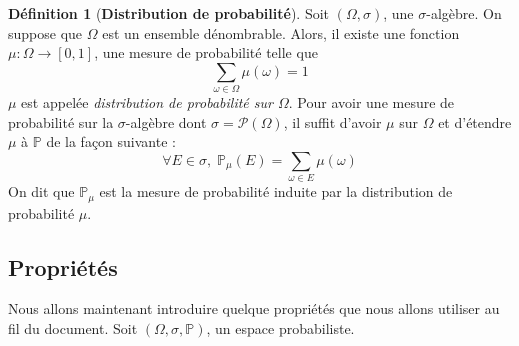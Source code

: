 \documentclass[12pt,a4paper]{report}
\theoremstyle{definition}%
\newtheorem{definition}{Définition}[chapter]
\theoremstyle{remark}
\newcommand{\pr}{\mathbb{P}}
\begin{document}
\begin{definition}[\textbf{Distribution de probabilité}] \label{distriprobadef}
	Soit $(\Omega, \sigma)$, une $\sigma$-algèbre.
	On suppose que $\Omega$ est un ensemble dénombrable. Alors, il existe une fonction $\mu: \Omega \rightarrow [0,1]$, une mesure de probabilité telle que
	\[\sum_{\omega \in \Omega} \mu(\omega) =1 \]
	$\mu$ est appelée \textit{distribution de probabilité sur $\Omega$}. Pour avoir une mesure de probabilité sur la $\sigma$-algèbre dont $\sigma = \mathcal{P}(\Omega)$, il suffit d'avoir $\mu$ sur $\Omega$ et d'étendre $\mu$ à $\pr$ de la façon suivante :
	\[ \forall E \in \sigma,\; \mathbb{P}_{\mu}(E) = \sum_{\omega \in E} \mu(\omega)\] On dit que $\pr_{\mu}$ est la mesure de probabilité induite par la distribution de probabilité $\mu$.
\end{definition}

\subsection*{Propriétés}
	Nous allons maintenant introduire quelque propriétés que nous allons utiliser au fil du document.
	Soit $(\Omega, \sigma, \mathbb{P})$, un espace probabiliste.
\end{document}
